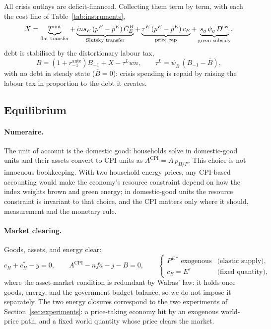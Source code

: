 All crisis outlays are deficit-financed. Collecting them term by term, with each the
cost line of Table~\ref{tab:instruments},
%
\begin{equation}
X=\underbrace{T^{\mathrm{unt}}}_{\text{flat transfer}}
+\underbrace{ins_E\,(p^{E}-\bar p^E)\,\bar C^{B}_E}_{\text{Slutsky transfer}}
+\underbrace{\tau^E\,(p^{E}-\bar p^E)\,c_E}_{\text{price cap}}
+\underbrace{s_g\,\psi_g\,D^{\mathrm{sw}}}_{\text{green subsidy}},
\label{eq:outlays}
\end{equation}
%
debt is stabilised by the distortionary labour tax,
%
\begin{equation}
B=(1+r^{\mathrm{ante}}_{-1})B_{-1}+X-\tau^L wn,
\qquad
\tau^L=\psi_B\,(B_{-1}-\bar B),
\label{eq:gbc2}
\end{equation}
%
with no debt in steady state ($\bar B=0$): crisis spending is repaid by raising the
labour tax in proportion to the debt it creates.

\subsection{Equilibrium}\label{sec:eqm}

\paragraph{Numeraire.}
The unit of account is the domestic good: households solve in domestic-good units
and their assets convert to CPI units as $A^{\mathrm{CPI}}=A\,p_{H/P}$. This
choice is not innocuous bookkeeping. With two household energy prices, any
CPI-based accounting would make the economy's resource constraint depend on how
the index weights brown and green energy; in domestic-good units the resource
constraint is invariant to that choice, and the CPI matters only where it
should, measurement and the monetary rule.

\paragraph{Market clearing.}
Goods, assets, and energy clear:
%
\begin{equation}
c_H+c^{*}_H-y=0,
\qquad
A^{\mathrm{CPI}}-nfa-j-B=0,
\qquad
\begin{cases}
P^{E*}\ \text{exogenous} & \text{(elastic supply)},\\
c_E=E^{s} & \text{(fixed quantity)},
\end{cases}
\label{eq:clearing}
\end{equation}
%
where the asset-market condition is redundant by Walras' law: it holds once goods,
energy, and the government budget balance, so we do not impose it separately. The two
energy closures correspond to the two experiments of Section~\ref{sec:experiments}: a
price-taking economy hit by an exogenous world-price path, and a fixed world quantity
whose price clears the market.

